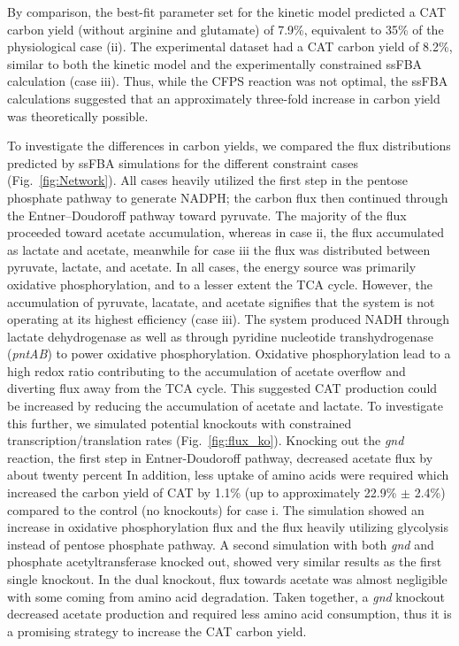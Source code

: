 \documentclass[12pt]{article}
\begin{document}
By comparison, the best-fit parameter set for the kinetic model predicted a CAT carbon yield (without arginine and glutamate) of 7.9\%, equivalent to 35\% of the physiological case (ii).
The experimental dataset had a CAT carbon yield of 8.2\%, similar to both the kinetic model and the experimentally constrained ssFBA calculation (case iii).
Thus, while the CFPS reaction was not optimal, the ssFBA calculations suggested that an approximately three-fold increase in carbon yield was theoretically possible.

To investigate the differences in carbon yields, we compared the flux distributions predicted by ssFBA simulations for the different constraint cases  (Fig.~\ref{fig:Network}).
All cases heavily utilized the first step in the pentose phosphate pathway to generate NADPH;
the carbon flux then continued through the Entner–Doudoroff pathway toward pyruvate.
The majority of the flux proceeded toward acetate accumulation, whereas in case ii, the flux accumulated as lactate and acetate, meanwhile for case iii the flux was distributed between pyruvate, lactate, and acetate.
In all cases, the energy source was primarily oxidative phosphorylation, and to a lesser extent the TCA cycle.
However, the accumulation of pyruvate, lacatate, and acetate signifies that the system is not operating at its highest efficiency (case iii).
The system produced NADH through lactate dehydrogenase as well as through pyridine nucleotide transhydrogenase (\textit{pntAB}) to power oxidative phosphorylation.
Oxidative phosphorylation lead to a high redox ratio contributing to the accumulation of acetate overflow and diverting flux away from the TCA cycle.
This suggested CAT production could be increased by reducing the accumulation of acetate and lactate.
To investigate this further, we simulated potential knockouts with constrained transcription/translation rates  (Fig.~\ref{fig:flux_ko}).
Knocking out the \textit{gnd} reaction, the first step in Entner-Doudoroff pathway, decreased acetate flux by about twenty percent
In addition, less uptake of amino acids were required which increased the carbon yield of CAT by 1.1\% (up to approximately 22.9\% $\pm$ 2.4\%) compared to the control (no knockouts) for case i.
The simulation showed an increase in oxidative phosphorylation flux and the flux heavily utilizing glycolysis instead of pentose phosphate pathway.
A second simulation with both \textit{gnd} and phosphate acetyltransferase knocked out,
showed very similar results as the first single knockout.
In the dual knockout, flux towards acetate was almost negligible with some coming from amino acid degradation.
Taken together, a \textit{gnd} knockout decreased acetate production and required less amino acid consumption, thus it is a promising strategy to increase the CAT carbon yield.
\end{document}
